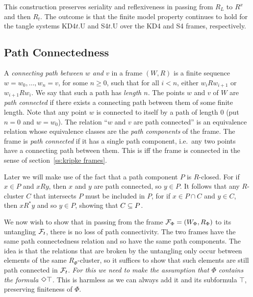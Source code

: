 This construction preserves seriality and reflexiveness in passing from $R_L$ to $R^x$ and then $R_t$.
The outcome  is that the finite model property continues to hold for the tangle systems  
  KD4$t$.U and S4$t$.U over the KD4 and S4 frames, respectively.

\subsection{Path Connectedness}\label{sec:path conn}

A \emph{connecting path between $w$ and $v$} in a frame $(W,R)$ is a finite sequence $w=w_0,\dots, w_n=v$, for some $n\geq 0$, such that for all $i<n$, either $w_iRw_{i+1}$ or $w_{i+1}Rw_i$. We say that such  a path has \emph{length $n$}. 
The points $w$ and $v$ of $W$ are \emph{path connected}  if there exists a connecting path between them of some finite length. Note that any point $w$ is  connected to itself by a path of length 0 (put $n=0$ and $w=w_0$). 
The relation ``$w$ and $v$ are path connected'' is an equivalence relation whose equivalence classes are the \emph{path components} of the frame. The frame is \emph{path connected} if it has a single path component, i.e.\   any two points have a connecting path between them.
This is iff the frame
is connected in the sense of section~\ref{ss:kripke frames}.

Later we will make use of the fact that a path component $P$ is $R$-closed. For if $x\in P$  and $xR y$, then $x$ and $y$ are  path connected, so $y\in P$. It follows that any $R$-cluster $C$ that intersects $P$ must be included in $P$, for if $x\in P\cap C$ and $y\in C$, then $xR^*y$ and so $y\in P$, showing that $C\subseteq P$.

We now wish to show that in passing from  the frame $\mathcal{F}_\Phi=(W_\Phi,R_\Phi)$ to its untangling $\mathcal{F}_t$, there is no loss of path connectivity. The two frames have the same path connectedness relation and so have the same path components.
The idea is that the relations that
are broken by the untangling only occur between elements of the same $R_\Phi$-cluster, so it suffices to show that such elements are still path connected in $\mathcal{F}_t$. \emph{For this we need to make the assumption that $\Phi$ contains the formula $\Diamond\top$. }This is harmless as we can always add it and its subformula $\top$, preserving finiteness of $\Phi$.

